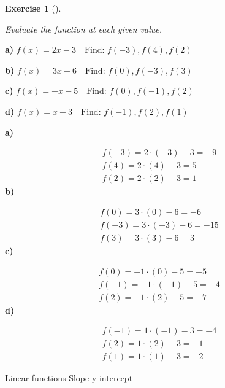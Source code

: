 \documentclass[
  letterpaper,
  DIV=11,
  numbers=noendperiod]{scrreprt}
\theoremstyle{definition}
\newtheorem{exercise}{Exercise}[chapter]
\theoremstyle{remark}
\begin{document}
\begin{exercise}[]\protect\hypertarget{exr-u7-8}{}\label{exr-u7-8}

\emph{Evaluate the function at each given value.}

\textbf{a)}
\(\displaystyle f(x) = 2x - 3 \quad \text{Find: } f(-3), f(4), f(2)\)

\textbf{b)}
\(\displaystyle f(x) = 3x - 6 \quad \text{Find: } f(0), f(-3), f(3)\)

\textbf{c)}
\(\displaystyle f(x) = -x - 5 \quad \text{Find: } f(0), f(-1), f(2)\)

\textbf{d)}
\(\displaystyle f(x) = x - 3 \quad \text{Find: } f(-1), f(2), f(1)\)

\begin{tcolorbox}[enhanced jigsaw, opacitybacktitle=0.6, coltitle=black, arc=.35mm, colframe=quarto-callout-tip-color-frame, colback=white, bottomrule=.15mm, left=2mm, colbacktitle=quarto-callout-tip-color!10!white, titlerule=0mm, opacityback=0, title=\textcolor{quarto-callout-tip-color}{\faLightbulb}\hspace{0.5em}{🔍 View Solutions}, leftrule=.75mm, breakable, rightrule=.15mm, bottomtitle=1mm, toptitle=1mm, toprule=.15mm]

\textbf{a)}

\[
\begin{aligned}
f(-3) = 2 \cdot (-3) - 3 = -9 \\[4pt] f(4) = 2 \cdot (4) - 3 = 5 \\[4pt] f(2) = 2 \cdot (2) - 3 = 1
\end{aligned}
\] \textbf{b)}

\[
\begin{aligned}
f(0) = 3 \cdot (0) - 6 = -6 \\[4pt] f(-3) = 3 \cdot (-3) - 6 = -15 \\[4pt] f(3) = 3 \cdot (3) - 6 = 3
\end{aligned}
\] \textbf{c)}

\[
\begin{aligned}
f(0) = -1 \cdot (0) - 5 = -5 \\[4pt] f(-1) = -1 \cdot (-1) - 5 = -4 \\[4pt] f(2) = -1 \cdot (2) - 5 = -7
\end{aligned}
\] \textbf{d)}

\[
\begin{aligned}
f(-1) = 1 \cdot (-1) - 3 = -4 \\[4pt] f(2) = 1 \cdot (2) - 3 = -1 \\[4pt] f(1) = 1 \cdot (1) - 3 = -2
\end{aligned}
\]

\end{tcolorbox}

{Linear functions} {Slope} {y-intercept}

\end{exercise}
\end{document}

